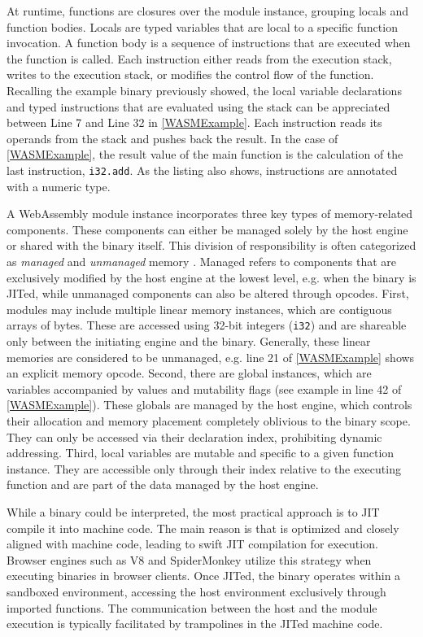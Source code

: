  At runtime, \Wasm functions are closures over the module instance, grouping locals and function bodies.
Locals are typed variables that are local to a specific function invocation.
A function body is a sequence of instructions that are executed when the function is called.
Each instruction either reads from the execution stack, writes to the execution stack, or modifies the control flow of the function.
Recalling the example \wasm binary previously showed, 
the local variable declarations and typed instructions that are evaluated using the stack can be appreciated between Line 7 and Line 32 in \autoref{WASMExample}. 
Each instruction reads its operands from the stack and pushes back the result. 
In the case of \autoref{WASMExample}, the result value of the main function is the calculation of the last instruction, \texttt{i32.add}. 
As the listing also shows, instructions are annotated with a numeric type.


 A WebAssembly module instance incorporates three key types of memory-related components. 
These components can either be managed solely by the host engine or shared with the \Wasm binary itself. 
This division of responsibility is often categorized as \emph{managed} and \emph{unmanaged} memory \cite{usenixWasm2020}. 
Managed refers to components that are exclusively modified by the host engine at the lowest level, e.g. when the \Wasm binary is JITed, while unmanaged components can also be altered through  \Wasm opcodes.
First, modules may include multiple linear memory instances, which are contiguous arrays of bytes. 
These are accessed using 32-bit integers (\texttt{i32}) and are shareable only between the initiating engine and the \Wasm binary. 
Generally, these linear memories are considered to be unmanaged, e.g. line 21 of \autoref{WASMExample} shows an explicit memory opcode. 
Second, there are global instances, which are variables accompanied by values and mutability flags (see example in line 42 of \autoref{WASMExample}). 
These globals are managed by the host engine, which controls their allocation and memory placement completely oblivious to the \Wasm binary scope. 
They can only be accessed via their declaration index, prohibiting dynamic addressing. 
Third, local variables are mutable and specific to a given function instance. 
They are accessible only through their index relative to the executing function and are part of the data managed by the host engine.


While a \Wasm binary could be interpreted, the most practical approach is to JIT compile it into machine code.
The main reason is that \Wasm is optimized and closely aligned with machine code, leading to swift JIT compilation for execution.
Browser engines such as V8 and SpiderMonkey utilize this strategy when executing \Wasm binaries in browser clients.
Once JITed, the \Wasm binary operates within a sandboxed environment, accessing the host environment exclusively through imported functions.
The communication between the host and the \Wasm module execution is typically facilitated by trampolines in the JITed machine code.

